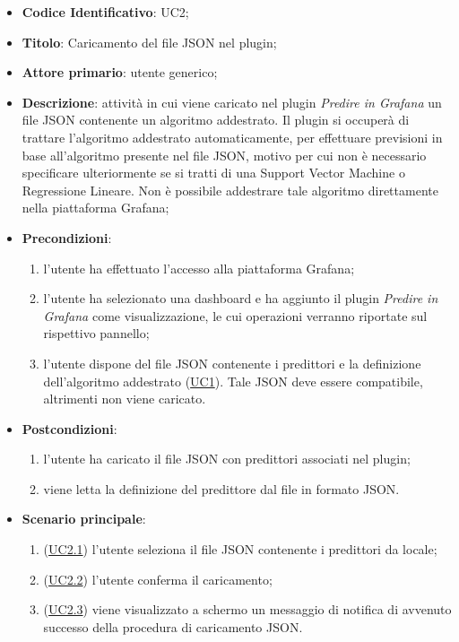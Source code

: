		\begin{itemize}
			\item\textbf{Codice Identificativo}: UC2;
			\item\textbf{Titolo}: Caricamento del file JSON nel plugin;
			\item\textbf{Attore primario}: utente generico;
			\item\textbf{Descrizione}: attività in cui viene caricato nel plugin \textit{Predire in Grafana} un file JSON contenente un algoritmo addestrato. Il plugin si occuperà di trattare l'algoritmo addestrato automaticamente, per effettuare previsioni in base all'algoritmo presente nel file JSON, motivo per cui non è necessario specificare ulteriormente se si tratti di una Support Vector Machine o Regressione Lineare. Non è possibile addestrare tale algoritmo direttamente nella piattaforma Grafana; 
			\item\textbf{Precondizioni}:
				\begin{enumerate}
					\item l'utente ha effettuato l'accesso alla piattaforma Grafana;
					\item l'utente ha selezionato una dashboard e ha aggiunto il plugin \textit{Predire in Grafana} come visualizzazione, le cui operazioni verranno riportate sul rispettivo pannello;
					\item l'utente dispone del file JSON contenente i predittori e la definizione dell'algoritmo addestrato (\hyperref[par:UC1]{UC1}). Tale JSON deve essere compatibile, altrimenti non viene caricato.
				\end{enumerate}
			\item\textbf{Postcondizioni}:
				\begin{enumerate}
					\item l'utente ha caricato il file JSON con predittori associati nel plugin;
					\item viene letta la definizione del predittore dal file in formato JSON.
				\end{enumerate}
			\item\textbf{Scenario principale}:
				\begin{enumerate}
					\item (\hyperref[par:UC2.1]{UC2.1}) l'utente seleziona il file JSON contenente i predittori da locale;
					\item (\hyperref[par:UC2.2]{UC2.2}) l'utente conferma il caricamento;
					\item (\hyperref[par:UC2.3]{UC2.3}) viene visualizzato a schermo un messaggio di notifica di avvenuto successo della procedura di caricamento JSON.

\end{enumerate}
\end{itemize}
